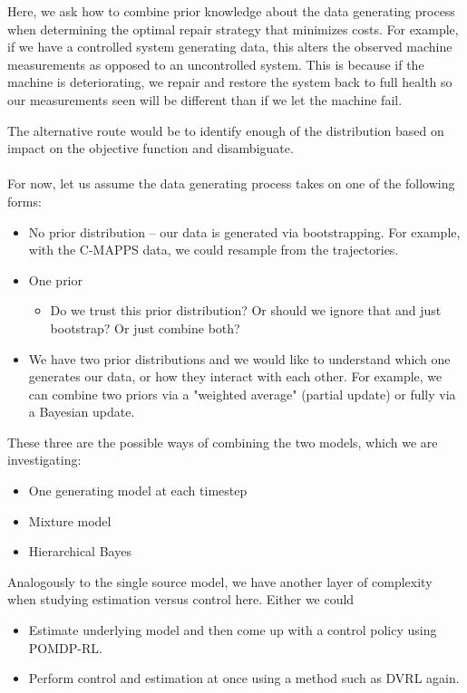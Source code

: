 \documentclass[english]{article}
\numberwithin{equation}{section}
\begin{document}
Here, we ask how to combine prior knowledge about the data generating process when determining the optimal repair strategy that minimizes costs. For example, if we have a controlled system generating data, this alters the observed machine measurements as opposed to an uncontrolled system. This is because if the machine is deteriorating, we repair and restore the system back to full health so our measurements seen will be different than if we let the machine fail.

The alternative route would be to identify enough of the distribution based on impact on the objective function and disambiguate. 
\\
\\
For now, let us assume the data generating process takes on one of the following forms:
\begin{itemize}
	\item No prior distribution -- our data is generated via bootstrapping. For example, with the C-MAPPS data, we could resample from the trajectories.
	\item One prior
	\begin{itemize}
		\item Do we trust this prior distribution? Or should we ignore that and just bootstrap? Or just combine both?
	\end{itemize}
	\item We have two prior distributions and we would like to understand which one generates our data, or how they interact with each other. For example, we can combine two priors via a "weighted average" (partial update) or fully via a Bayesian update.
\end{itemize}

These three are the possible ways of combining the two models, which we are investigating:
\begin{itemize}
	\item One generating model at each timestep
	\item Mixture model
	\item Hierarchical Bayes
\end{itemize}

Analogously to the single source model, we have another layer of complexity when studying estimation versus control here. Either we could
\begin{itemize}
	\item Estimate underlying model and then come up with a control policy using POMDP-RL.
	\item Perform control and estimation at once using a method such as DVRL again.
\end{itemize}
\end{document}
